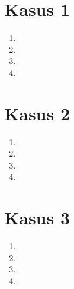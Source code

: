 \documentclass[11pt,a4paper]{article}
\newcommand{\codeListing}[3] {

  


}
\begin{document}
\begin{multicols}{2}

  \section*{Kasus 1}
  \begin{enumerate}

    \item \codeListing{1}{1}{0.5}

    \item \codeListing{1}{2}{0.5}

    \item \codeListing{1}{3}{0.5}

    \item \codeListing{1}{4}{0.5}

  \end{enumerate}

  \columnbreak

  \section*{Kasus 2}
  \begin{enumerate}

    \item \codeListing{2}{1}{0.5}

    \item \codeListing{2}{2}{0.5}

    \item \codeListing{2}{3}{0.5}

    \item \codeListing{2}{4}{0.5}

  \end{enumerate}

  \newpage

  \section*{Kasus 3}
  \begin{enumerate}

    \item \codeListing{3}{1}{0.5}

    \item \codeListing{3}{2}{0.5}

    \item \codeListing{3}{3}{0.5}

    \item \codeListing{3}{4}{0.5}


\end{enumerate}
\end{multicols}
\end{document}
